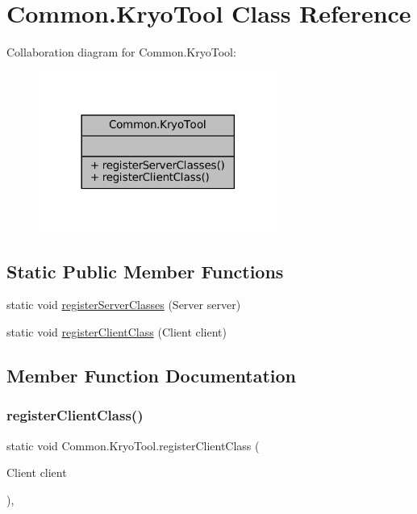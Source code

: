 \hypertarget{classCommon_1_1KryoTool}{}\section{Common.\+Kryo\+Tool Class Reference}
\label{classCommon_1_1KryoTool}


Collaboration diagram for Common.\+Kryo\+Tool\+:
\nopagebreak
\begin{figure}[H]
\begin{center}
\leavevmode
\includegraphics[width=222pt]{classCommon_1_1KryoTool__coll__graph}
\end{center}
\end{figure}
\subsection*{Static Public Member Functions}
\begin{DoxyCompactItemize}
\item 
static void \mbox{\hyperlink{classCommon_1_1KryoTool_a263006a45f41c011a3ad7dfb0086f551}{register\+Server\+Classes}} (Server server)
\item 
static void \mbox{\hyperlink{classCommon_1_1KryoTool_ab2aa3283b39bc6f71f770f51e76d8246}{register\+Client\+Class}} (Client client)
\end{DoxyCompactItemize}


\subsection{Member Function Documentation}
\mbox{\label{classCommon_1_1KryoTool_ab2aa3283b39bc6f71f770f51e76d8246}} 
\subsubsection{\texorpdfstring{register\+Client\+Class()}{registerClientClass()}}
{\footnotesize\ttfamily static void Common.\+Kryo\+Tool.\+register\+Client\+Class (\begin{DoxyParamCaption}\item[{Client}]{client }\end{DoxyParamCaption})\hspace{0.3cm}{\ttfamily [inline]}, {\ttfamily [static]}}

